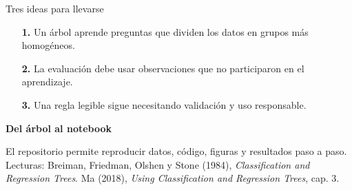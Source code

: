 \documentclass[aspectratio=169,11pt]{beamer}
\newcommand{\framesource}{}
\newcommand{\source}[1]{%
  \gdef\framesource{Fuente: #1}%
}
\begin{document}
\begin{frame}{Tres ideas para llevarse}
  \vspace{0.3cm}
  \begin{enumerate}
    \item[\color{Petroleo}\Large\bfseries 1.] \large Un árbol aprende preguntas que dividen los datos en grupos más homogéneos.
    \vspace{0.45cm}
    \item[\color{Petroleo}\Large\bfseries 2.] \large La evaluación debe usar observaciones que no participaron en el aprendizaje.
    \vspace{0.45cm}
    \item[\color{Petroleo}\Large\bfseries 3.] \large Una regla legible sigue necesitando validación y uso responsable.
  \end{enumerate}
  \vspace{0.65cm}
  {\color{Coral!90!black}\Large\bfseries Del árbol al notebook}\par
  \small El repositorio permite reproducir datos, código, figuras y resultados paso a paso.
  \vfill
  {\color{Gris}\tiny
    Lecturas: Breiman, Friedman, Olshen y Stone (1984), \emph{Classification and Regression Trees}.\quad
    Ma (2018), \emph{Using Classification and Regression Trees}, cap. 3.}
  \source{Breiman et al. (1984); Ma (2018), cap. 3.}
\end{frame}
\end{document}
